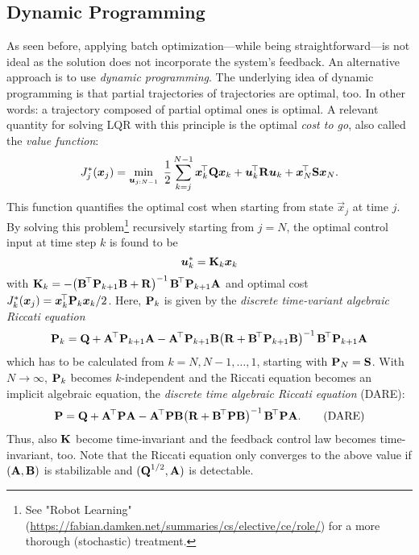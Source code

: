 		\subsection{Dynamic Programming}
			As seen before, applying batch optimization---while being straightforward---is not ideal as the solution does not incorporate the system's feedback. An alternative approach is to use \emph{dynamic programming}. The underlying idea of dynamic programming is that partial trajectories of trajectories are optimal, too. In other words: a trajectory composed of partial optimal ones is optimal. A relevant quantity for solving LQR with this principle is the optimal \emph{cost to go}, also called the \emph{value function}:
			\begin{equation}
				J_j^\ast(\bm{x}_j) = \min_{\bm{u}_{j:N - 1}}\; \frac{1}{2} \sum_{k = j}^{N - 1} \bm{x}_k^{\!\top} \bm{\mathrm{Q}} \bm{x}_k + \bm{u}_k^{\!\top} \bm{\mathrm{R}} \bm{u}_k + \bm{x}_N^{\!\top} \bm{\mathrm{S}} \bm{x}_N.
			\end{equation}
			This function quantifies the optimal cost when starting from state \(\vec{x}_j\) at time \(j\). By solving this problem\footnote{See "Robot Learning" (\url{https://fabian.damken.net/summaries/cs/elective/ce/role/}) for a more thorough (stochastic) treatment.} recursively starting from \(j = N\), the optimal control input at time step \(k\) is found to be
			\begin{equation}
				\bm{u}_k^\ast = \bm{\mathrm{K}}_k \bm{x}_k
			\end{equation}
			with \( \bm{\mathrm{K}}_k = -\bigl( \bm{\mathrm{B}}^{\!\top} \bm{\mathrm{P}}_{k + 1} \bm{\mathrm{B}} + \bm{\mathrm{R}} \bigr)^{-1\,} \bm{\mathrm{B}}^{\!\top} \bm{\mathrm{P}}_{k + 1} \bm{\mathrm{A}} \) and optimal cost \( J_k^\ast(\bm{x}_j) = \bm{x}_k^{\!\top} \bm{\mathrm{P}}_k \bm{x}_k / 2 \). Here, \( \bm{\mathrm{P}}_k \) is given by the \emph{discrete time-variant algebraic Riccati equation}
			\begin{equation}
				\bm{\mathrm{P}}_k = \bm{\mathrm{Q}} + \bm{\mathrm{A}}^{\!\top} \bm{\mathrm{P}}_{k + 1} \bm{\mathrm{A}} - \bm{\mathrm{A}}^{\!\top} \bm{\mathrm{P}}_{k + 1} \bm{\mathrm{B}} \bigl( \bm{\mathrm{R}} + \bm{\mathrm{B}}^{\!\top} \bm{\mathrm{P}}_{k + 1} \bm{\mathrm{B}} \bigr)^{-1\,} \bm{\mathrm{B}}^{\!\top} \bm{\mathrm{P}}_{k + 1} \bm{\mathrm{A}}
			\end{equation}
			which has to be calculated from \( k = N, N - 1, \dots, 1 \), starting with \( \bm{\mathrm{P}}_N = \bm{\mathrm{S}} \). With \(N \to \infty\), \(\bm{\mathrm{P}}_k\) becomes \(k\)-independent and the Riccati equation becomes an implicit algebraic equation, the \emph{discrete time algebraic Riccati equation} (DARE):
			\begin{equation}
				\bm{\mathrm{P}} = \bm{\mathrm{Q}} + \bm{\mathrm{A}}^{\!\top} \bm{\mathrm{P}} \bm{\mathrm{A}} - \bm{\mathrm{A}}^{\!\top} \bm{\mathrm{P}} \bm{\mathrm{B}} \bigl( \bm{\mathrm{R}} + \bm{\mathrm{B}}^{\!\top} \bm{\mathrm{P}} \bm{\mathrm{B}} \bigr)^{-1\,} \bm{\mathrm{B}}^{\!\top} \bm{\mathrm{P}} \bm{\mathrm{A}}.  \tag{DARE}
			\end{equation}
			Thus, also \(\bm{\mathrm{K}}\) become time-invariant and the feedback control law becomes time-invariant, too. Note that the Riccati equation only converges to the above value if \( (\bm{\mathrm{A}}, \bm{\mathrm{B}}) \) is stabilizable and \( (\bm{\mathrm{Q}}^{1/2}, \bm{\mathrm{A}}) \) is detectable.

